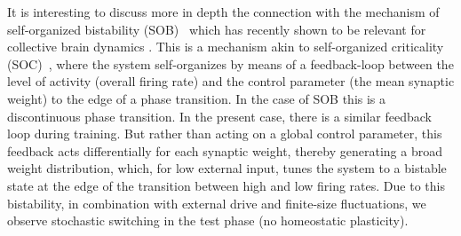 It is interesting to discuss more in depth the connection with the mechanism of self-organized bistability (SOB)~\cite{di_santo_self-organized_2016, buendia_feedback_2020} which has recently shown to be relevant for collective brain dynamics \cite{buendia_self-organized_2020}.
This is a mechanism akin to self-organized criticality (SOC)~\cite{bak_self-organized_1988, buendia_feedback_2020}, where the system self-organizes by means of a feedback-loop between the level of activity (overall firing rate) and the control parameter (the mean synaptic weight) to the edge of a phase transition.
In the case of SOB this is a discontinuous phase transition.
In the present case, there is a similar feedback loop during training.
But rather than acting on a global control parameter, this feedback acts differentially for each synaptic weight, thereby generating a broad weight distribution, which, for low external input, tunes the system to a bistable state at the edge of the transition between high and low firing rates.
Due to this bistability, in combination with external drive and finite-size fluctuations, we observe stochastic switching in the test phase (no homeostatic plasticity).


